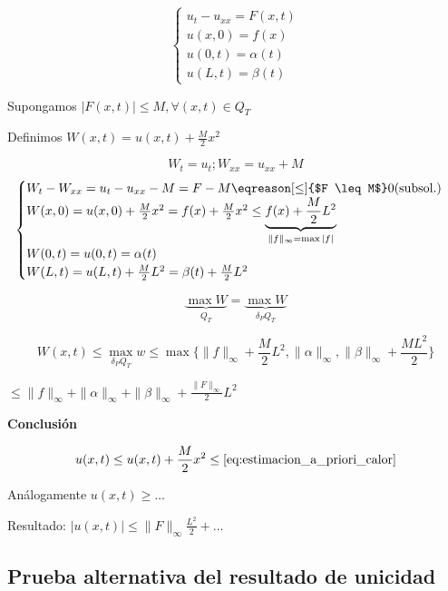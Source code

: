 	 \begin{example}

	 	\[\begin{cases}
	 		u_{t} - u_{xx} = F(x,t) \\
			u(x,0) = f(x) \\
			u(0,t) = \alpha(t) \\
			u(L,t) = \beta(t)
	 	\end{cases}\]

	 	Supongamos $|F(x,t)| \leq M, \forall(x,t) \in Q_T$

	 	Definimos $W(x,t) = u(x,t) + \frac{M}{2} x^2$

	 	\[ W_t = u_t ; W_{xx} = u_{xx} + M\]
	 	\[\begin{cases}
	 		W_t - W_{xx} = u_t - u_{xx} - M = F-M \eqreason[\leq]{$F \leq M$} 0 (\text{subsol.})\\
	 		W(x,0) = u(x,0) + \frac{M}{2} x^2 = f(x) + \frac{M}{2} x^2 \leq \underbrace{f(x) + \frac{M}{2}L^2}_{\|f\|_\infty = \max |f|}\\
	 		W(0,t) = u(0,t) = \alpha(t) \\
	 		W(L,t) = u(L,t) + \frac{M}{2}L^2 = \beta(t) + \frac{M}{2} L^2
	 	\end{cases}\]

	 	\[ \underbrace{\max W}_{Q_T} = \underbrace{\max W}_{\delta_P Q_T} \]

	 	\[ W(x,t) \leq \max\limits_{\delta_P Q_T} w \leq \max \{ \|f\|_\infty + \frac{M}{2}L^2, \|\alpha\|_\infty, \|\beta\|_\infty + \frac{ML^2}{2}\} \]

	 	\(\leq \|f\|_\infty + \|\alpha\|_\infty + \|\beta\|_\infty + \frac{\|F\|_\infty}{2}L^2 \label{eq:estimacion_a_priori_calor}\)

	 	\textbf{Conclusión}

	 	\[ u(x,t) \leq u(x,t) + \frac{M}{2}x^2 \leq \eqref{eq:estimacion_a_priori_calor} \]

	 	Análogamente $u(x,t) \geq … $

	 	Resultado: $|u(x,t)| \leq \|F\|_\infty \frac{L^2}{2} + … $

	\end{example}



	\subsection{Prueba alternativa del resultado de unicidad}
		\label{sec:Calor:Unicidad}

